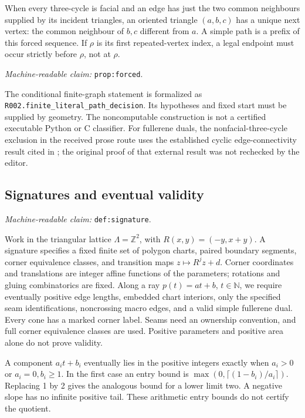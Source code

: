 \documentclass[11pt]{amsart}
\newcommand{\Z}{\mathbb Z}
\newcommand{\N}{\mathbb N}
\newcommand{\record}[1]{\nolinkurl{#1}}
\newcommand{\claimid}[1]{\par\nopagebreak\noindent\textit{Machine-readable claim:} \record{#1}.\par}
\theoremstyle{definition}\newtheorem{definition}{Definition}
\begin{document}
When every three-cycle is facial and an edge has just the two common
neighbours supplied by its incident triangles, an oriented triangle
$(a,b,c)$ has a unique next vertex: the common neighbour of $b,c$
different from $a$. A simple path is a prefix of this forced sequence.
If $\rho$ is its first repeated-vertex index, a legal endpoint must
occur strictly before $\rho$, not at $\rho$.
\label{prop:forced}\claimid{prop:forced}
The conditional finite-graph statement is formalized as
\record{R002.finite_literal_path_decision}. Its hypotheses and fixed
start must be supplied by geometry. The noncomputable construction
is not a certified executable Python or C classifier. For fullerene
duals, the nonfacial-three-cycle exclusion in the received prose route
uses the established cyclic edge-connectivity result cited in
\cite{Connectivity}; the original proof of that external result was
not rechecked by the editor.

\subsection{Signatures and eventual validity}\label{def:signature}
\claimid{def:signature}
Work in the triangular lattice $\Lambda=\Z^2$, with
$R(x,y)=(-y,x+y)$. A signature specifies a fixed finite set of polygon
charts, paired boundary segments, corner equivalence classes, and
transition maps $z\mapsto R^jz+d$. Corner coordinates and translations
are integer affine functions of the parameters; rotations and gluing
combinatorics are fixed. Along a ray $p(t)=at+b$, $t\in\N$, we require
eventually positive edge lengths, embedded chart interiors, only the
specified seam identifications, noncrossing macro edges, and a valid
simple fullerene dual. Every cone has a marked corner label. Seams
need an ownership convention, and full corner equivalence classes are
used. Positive parameters and positive area alone do not prove validity.

A component $a_it+b_i$ eventually lies in the positive integers exactly
when $a_i>0$ or $a_i=0,b_i\ge1$. In the first case an entry bound is
$\max(0,\lceil(1-b_i)/a_i\rceil)$. Replacing 1 by 2 gives the analogous
bound for a lower limit two. A negative slope has no infinite positive
tail. These arithmetic entry bounds do not certify the quotient.
\end{document}
